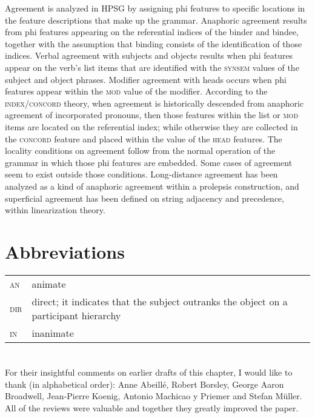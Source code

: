 \documentclass[output=paper
 	        ,biblatex
                ,babelshorthands
                ,newtxmath
                ,draftmode
                ,colorlinks, citecolor=brown
]{langscibook}
\begin{document}
Agreement is analyzed in HPSG by assigning phi features to specific locations in the feature
descriptions that make up the grammar. Anaphoric agreement results from phi
features appearing on the referential indices of the binder and bindee, together with the assumption
that binding consists of the identification of those indices.  Verbal agreement with subjects and
objects results when phi features appear on the verb's \argst list items that are identified with
the \textsc{synsem} values of the subject and object phrases.  Modifier agreement with heads occurs
when phi features appear within the \textsc{mod} value of the modifier.  According to the
\textsc{index}/\textsc{concord} theory, when agreement is historically descended from anaphoric
agreement of incorporated pronouns, then those features within the \argst list or \textsc{mod} items
are located  on the referential index; while otherwise they are collected in the \textsc{concord}
feature and placed within the value of the \textsc{head} features.   The locality conditions on
agreement follow from the normal operation of the grammar in which those phi features are embedded.
Some cases of agreement seem to exist outside those conditions.  Long-distance agreement has been
analyzed as a kind of anaphoric agreement within a prolepsis construction, and superficial agreement
has been defined on string adjacency and precedence, within linearization theory.  

\section*{Abbreviations}


\begin{tabularx}{.99\textwidth}{@{}lX}
\textsc{an}  & animate\\
\textsc{dir} & direct; it indicates that the subject outranks the object on a participant hierarchy\\
\textsc{in}  & inanimate\\
\end{tabularx}



\section*{\acknowledgmentsUS}

For their insightful comments on earlier drafts of this chapter, I would like to thank (in
alphabetical order): Anne Abeillé, Robert Borsley, George Aaron Broadwell, Jean-Pierre Koenig,
Antonio Machicao y Priemer and Stefan Müller. All of the reviews were valuable and together they
greatly improved the paper.





{\sloppy
\printbibliography[heading=subbibliography,notkeyword=this] 
}
\end{document}
